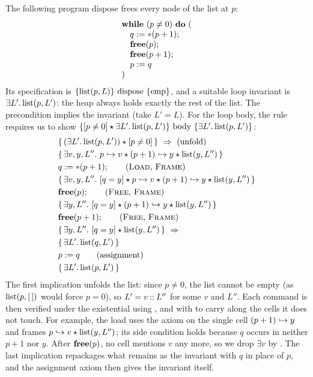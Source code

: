 The following program $\mathrm{dispose}$ frees every node of the list at $p$:
\[
  \begin{array}{l}
    \mathbf{while}\ (p\neq 0)\ \mathbf{do}\ (\\
    \quad q:=\ast(p+1);\\
    \quad\mathbf{free}(p);\\
    \quad\mathbf{free}(p+1);\\
    \quad p:=q\\
    )
  \end{array}
\]
Its specification is $\{\mathrm{list}(p,L)\}\ \mathrm{dispose}\ \{\mathrm{emp}\}$, and a suitable loop invariant is
$\exists L'.\,\mathrm{list}(p,L')$: the heap always holds exactly the rest of the list. The precondition
implies the invariant (take $L'=L$). For the loop body, the  rule requires us to show
$\{\pure{p\neq 0}\sep\exists L'.\,\lst(p,L')\}\ \mathrm{body}\ \{\exists L'.\,\lst(p,L')\}$:
\begin{align*}
  &\{\,(\exists L'.\,\lst(p,L'))\sep\pure{p\neq 0}\,\}\ \Rightarrow\ \text{(unfold)}\\
  &\{\,\exists v,y,L''.\ p\pto v\sep(p+1)\pto y\sep\lst(y,L'')\,\}\\
  &q:=\ast(p+1);\qquad\text{(\rn{Load}, \rn{Frame})}\\
  &\{\,\exists v,y,L''.\ \pure{q=y}\sep p\pto v\sep(p+1)\pto y\sep\lst(y,L'')\,\}\\
  &\kw{free}(p);\qquad\text{(\rn{Free}, \rn{Frame})}\\
  &\{\,\exists y,L''.\ \pure{q=y}\sep(p+1)\pto y\sep\lst(y,L'')\,\}\\
  &\kw{free}(p+1);\qquad\text{(\rn{Free}, \rn{Frame})}\\
  &\{\,\exists y,L''.\ \pure{q=y}\sep\lst(y,L'')\,\}\ \Rightarrow\\
  &\{\,\exists L'.\,\lst(q,L')\,\}\\
  &p:=q\qquad\text{(assignment)}\\
  &\{\,\exists L'.\,\lst(p,L')\,\}
\end{align*}
The first implication unfolds the list: since $p\neq 0$, the list cannot be empty (as
$\mathrm{list}(p,[\,])$ would force $p=0$), so $L'=v\mathbin{::} L''$ for some $v$ and $L''$. Each command is then
verified under the existential using , and with  to carry along the cells it
does not touch. For example, the load uses the  axiom on the single cell $(p+1)\hookrightarrow y$ and
frames $p\hookrightarrow v\mathbin{\star}\mathrm{list}(y,L'')$; its side condition holds because $q$ occurs in neither $p+1$ nor
$y$. After $\mathbf{free}(p)$, no cell mentions $v$ any more, so we drop $\exists v$ by
. The last implication repackages what remains as the invariant with $q$ in place
of $p$, and the assignment axiom then gives the invariant itself.

